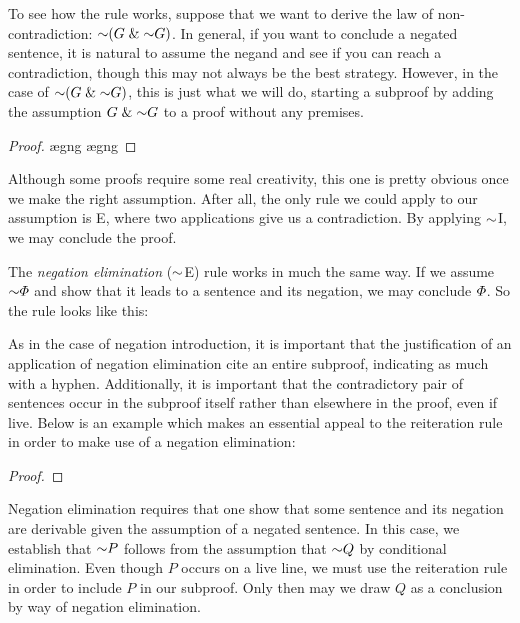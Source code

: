 To see how the rule works, suppose that we want to derive the law of non-contradiction: $\enot(G \eand \enot G)$.
In general, if you want to conclude a negated sentence, it is natural to assume the negand and see if you can reach a contradiction, though this may not always be the best strategy.
However, in the case of $\enot (G \eand \enot G)$, this is just what we will do, starting a subproof by adding the assumption $G\eand \enot G$ to a proof without any premises.

\begin{proof}
	\open 
		\ae{gng}
		\ae{gng}
	\close
\end{proof}

Although some proofs require some real creativity, this one is pretty obvious once we make the right assumption.
After all, the only rule we could apply to our assumption is {\eand}E, where two applications give us a contradiction.
By applying $\enot$I, we may conclude the proof.

The \textit{negation elimination} ($\enot$E) rule works in much the same way.
If we assume $\enot\metaA$ and show that it leads to a sentence and its negation, we may conclude $\varPhi$.
So the rule looks like this:


As in the case of negation introduction, it is important that the justification of an application of negation elimination cite an entire subproof, indicating as much with a hyphen.
Additionally, it is important that the contradictory pair of sentences occur in the subproof itself rather than elsewhere in the proof, even if live.
Below is an example which makes an essential appeal to the reiteration rule in order to make use of a negation elimination:

\begin{proof}
	 \pr{}
	 
	\open
		 
	\close
\end{proof}

Negation elimination requires that one show that some sentence and its negation are derivable given the assumption of a negated sentence.
In this case, we establish that $\enot P$ follows from the assumption that $\enot Q$ by conditional elimination.
Even though $P$ occurs on a live line, we must use the reiteration rule in order to include $P$ in our subproof.
Only then may we draw $Q$ as a conclusion by way of negation elimination. 


